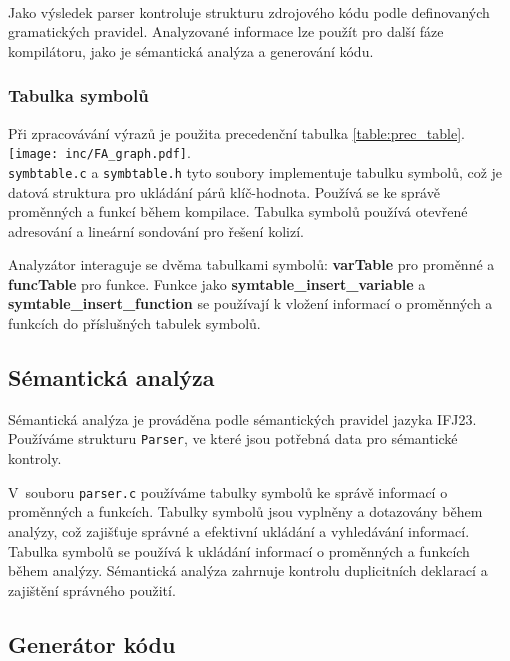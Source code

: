\documentclass[a4paper, 11pt]{article}
\begin{document}
\\
Jako výsledek parser kontroluje strukturu zdrojového kódu podle definovaných gramatických pravidel.
Analyzované informace lze použít pro další fáze kompilátoru, jako je sémantická analýza a generování kódu.

	
	\subsubsection{Tabulka symbolů}

	Při zpracovávání výrazů je použita precedenční tabulka \ref{table:prec_table}. 
        \\
        \texttt{[image: inc/FA\_graph.pdf]}. 
        \\
        \verb|symbtable.c| a \verb|symbtable.h| tyto soubory implementuje tabulku symbolů, což je datová struktura pro ukládání párů klíč-hodnota. Používá se ke správě proměnných a funkcí během kompilace. Tabulka symbolů používá otevřené adresování a lineární sondování pro řešení kolizí.

        Analyzátor interaguje se dvěma tabulkami symbolů: \textbf{varTable}  pro proměnné a \textbf{funcTable} pro funkce.
        Funkce jako \textbf{symtable\_insert\_variable} a \textbf{symtable\_insert\_function} se používají k vložení informací o proměnných a funkcích do příslušných tabulek symbolů.
        

	\subsection{Sémantická analýza}

	Sémantická analýza je prováděna podle sémantických pravidel jazyka IFJ23. Používáme strukturu \verb|Parser|, ve které jsou potřebná data pro sémantické kontroly. 

    V~souboru \verb|parser.c| používáme tabulky symbolů ke správě informací o proměnných a funkcích. Tabulky symbolů jsou vyplněny a dotazovány během analýzy, což zajišťuje správné a efektivní ukládání a vyhledávání informací. 
    Tabulka symbolů se používá k ukládání informací o proměnných a funkcích během analýzy.
    Sémantická analýza zahrnuje kontrolu duplicitních deklarací a zajištění správného použití.



	\subsection{Generátor kódu}
 
\end{document}
